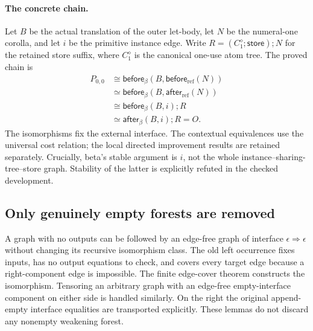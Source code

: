 \paragraph{The concrete chain.}
Let $B$ be the actual translation of the outer let-body, let $N$ be the
numeral-one corolla, and let $i$ be the primitive instance edge. Write
$R=(C^\diamond_1;\mathsf{store});N$ for the retained store suffix, where $C^\diamond_1$ is the canonical
one-use atom tree. The proved chain is
\[
 \begin{aligned}
 P_{0,0}&\cong\mathsf{before}_{\beta}(B,\mathsf{before}_{\mathrm{ref}}(N))\\
 &\simeq\mathsf{before}_{\beta}(B,\mathsf{after}_{\mathrm{ref}}(N))\\
 &\cong\mathsf{before}_{\beta}(B,i);R\\
 &\simeq\mathsf{after}_{\beta}(B,i);R=O.
 \end{aligned}
\]
The isomorphisms fix the external interface. The contextual equivalences use
the universal cost relation; the local directed improvement results are
retained separately. Crucially, beta's stable argument is $i$, not the whole
instance--sharing-tree--store graph. Stability of the latter is explicitly
refuted in the checked development.

\subsection{Only genuinely empty forests are removed}

A graph with no outputs can be followed by an edge-free graph of interface
$\epsilon\Rightarrow\epsilon$ without changing its recursive isomorphism
class. The old left occurrence fixes inputs, has no output equations to
check, and covers every target edge because a right-component edge is
impossible. The finite edge-cover theorem constructs the isomorphism.
Tensoring an arbitrary graph with an edge-free empty-interface component
on either side is handled similarly. On the right the original append-empty
interface equalities are transported explicitly. These lemmas do not discard
any nonempty weakening forest.




